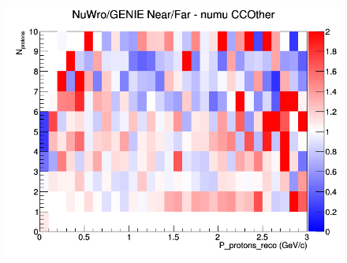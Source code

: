 \documentclass[12pt]{article}
\begin{document}
\begin{figure}[h]
\endminipage
{}
\includegraphics[width=\linewidth]{eff_N_P/LAr/protons/ratios/CCOther_NuWro_GENIE_numu_NF_N_P.png}
\endminipage
\newline
\end{figure}
\clearpage
\end{document}
